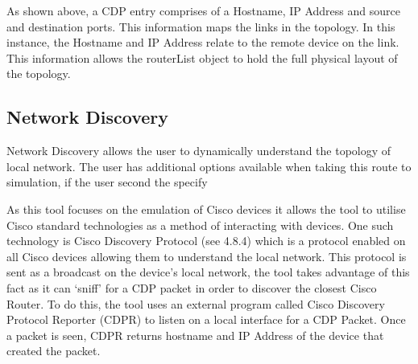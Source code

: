 \documentclass[11pt]{report}
\begin{document}
As shown above, a CDP entry comprises of a Hostname, IP Address and source and destination ports. This information maps the links in the topology. In this instance, the Hostname and IP Address relate to the remote device on the link. This information allows the routerList object to hold the full physical layout of the topology.

\subsection{Network Discovery}

Network Discovery allows the user to dynamically understand the topology of local network. The user has additional options available when taking this route to simulation, if the user second the specify 

 As this tool focuses on the emulation of Cisco devices it allows the tool to utilise Cisco standard technologies as a method of interacting with devices. One such technology is Cisco Discovery Protocol (see 4.8.4) which is a protocol enabled on all Cisco devices allowing them to understand the local network. This protocol is sent as a broadcast on the device's local network, the tool takes advantage of this fact as it can `sniff' for a CDP packet in order to discover the closest Cisco Router. To do this, the tool uses an external program called Cisco Discovery Protocol Reporter (CDPR)  \citep{CDPR} to listen on a local interface for a CDP Packet. Once a packet is seen, CDPR returns hostname and IP Address of the device that created the packet.
\end{document}
